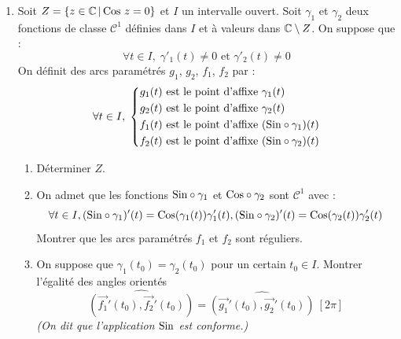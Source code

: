 \begin{enumerate}
\item Soit $Z = \{z \in \mathbb{C}\, | \, \textnormal{Cos}\ z =0\}$ et $I$ un intervalle ouvert.\newline
Soit $\gamma_{1}$ et $\gamma_{2}$ deux fonctions de classe $\mathcal C^1$ définies dans $I$ et à valeurs dans $\mathbb{C} \setminus Z$. On suppose que :
\begin{displaymath}
 \forall t\in I,\; \gamma'_1(t)\neq 0 \text{ et } \gamma'_2(t)\neq 0
\end{displaymath}
On définit des arcs paramétrés $g_1$, $g_2$, $f_1$, $f_2$ par :
\begin{displaymath}
 \forall t\in I ,\;
\left\lbrace 
\begin{aligned}
 g_1(t) &\text{ est le point d'affixe } \gamma_1(t) \\
 g_2(t) &\text{ est le point d'affixe } \gamma_2(t) \\
 f_1(t) &\text{ est le point d'affixe } (\textnormal{Sin} \circ \gamma_1) (t) \\
 f_2(t) &\text{ est le point d'affixe } (\textnormal{Sin} \circ \gamma_2) (t)
\end{aligned}
\right. 
\end{displaymath}

\begin{enumerate}
\item  Déterminer $Z$. 
\item On admet que les fonctions $\textnormal{Sin} \circ \gamma_1$ et $\textnormal{Cos} \circ \gamma_2$ sont $\mathcal C^1$ avec :
\begin{displaymath}
 \forall t\in I, (\textnormal{Sin} \circ \gamma_1)'(t) = \textnormal{Cos}(\gamma_1(t))\gamma_1'(t), (\textnormal{Sin} \circ \gamma_2)'(t) = \textnormal{Cos}(\gamma_2(t))\gamma_2'(t) 
\end{displaymath}
Montrer que les arcs paramétrés $f_1$ et $f_2$ sont réguliers. 
\item On suppose que $\gamma_1(t_0) = \gamma_2(t_0)$ pour un certain $t_0\in I$. Montrer l'\'egalit\'e des angles orient\'es 
\begin{displaymath}
 \widehat{(\overrightarrow{f_{1}}'(t_0),\overrightarrow{f_{2}}'(t_0))} =
 \widehat{(\overrightarrow{g_{1}}'(t_0),\overrightarrow{g_{2}}'(t_0))}\ [2\pi]
\end{displaymath}
 \emph{(On dit que l'application $\textnormal{Sin}$ est conforme.)}
\end{enumerate}


\end{enumerate}
